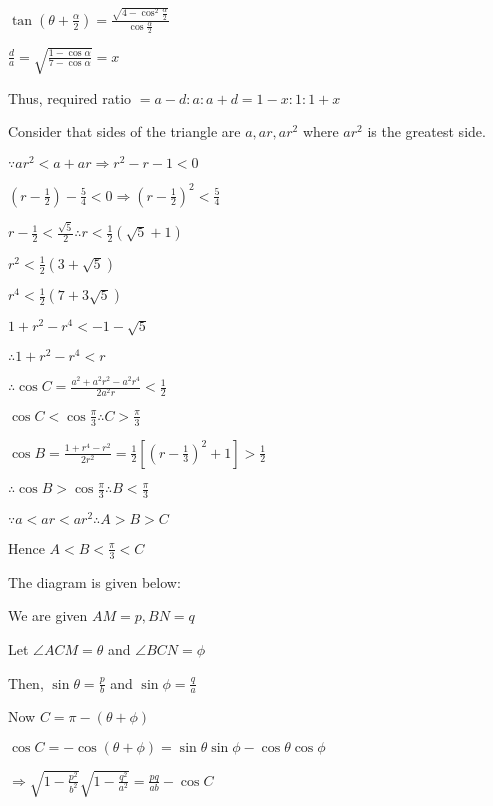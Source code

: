   $\tan\left(\theta + \frac{\alpha}{2}\right) = \frac{\sqrt{4 - \cos^2\frac{\alpha}{2}}}{\cos\frac{\alpha}{2}}$

  $\frac{d}{a} = \sqrt{\frac{1 - \cos\alpha}{7 - \cos\alpha}} = x$

  Thus, required ratio $= a - d:a:a + d = 1 - x: 1: 1 + x$

\item Consider that sides of the triangle are $a, ar, ar^2$ where $ar^2$ is the greatest side.

  $\because ar^2 < a + ar \Rightarrow r^2 -r - 1 < 0$

  $\left(r - \frac{1}{2}\right) - \frac{5}{4} < 0 \Rightarrow \left(r - \frac{1}{2}\right)^2 < \frac{5}{4}$

  $r - \frac{1}{2} < \frac{\sqrt{5}}{2} \therefore r < \frac{1}{2}(\sqrt{5} + 1)$

  $r^2 < \frac{1}{2}(3 + \sqrt{5})$

  $r^4 < \frac{1}{2}(7 + 3\sqrt{5})$

  $1 + r^2 - r^4 < - 1 - \sqrt{5}$

  $\therefore 1 + r^2 - r^4 < r$

  $\therefore \cos C = \frac{a^2 + a^2r^2 - a^2r^4}{2a^2r} < \frac{1}{2}$

  $\cos C < \cos \frac{\pi}{3} \therefore C > \frac{\pi}{3}$

  $\cos B = \frac{1 + r^4 - r^2}{2r^2} = \frac{1}{2}\left[\left(r - \frac{1}{3}\right)^2 + 1\right] > \frac{1}{2}$

  $\therefore \cos B > \cos\frac{\pi}{3} \therefore B < \frac{\pi}{3}$

  $\because a < ar <ar^2 \therefore A > B > C$

  Hence $A < B < \frac{\pi}{3} < C$

\item  The diagram is given below:

  \startplacefigure
    \externalfigure[20_5.pdf]
  \stopplacefigure

  We are given $AM = p, BN = q$

  Let $\angle ACM = \theta$ and $\angle BCN = \phi$

  Then, $\sin\theta = \frac{p}{b}$ and $\sin\phi = \frac{q}{a}$

  Now $C = \pi - (\theta + \phi)$

  $\cos C = -\cos(\theta + \phi) = \sin\theta\sin\phi -\cos\theta\cos\phi$

  $\Rightarrow \sqrt{1 - \frac{p^2}{b^2}}\sqrt{1 - \frac{q^2}{a^2}} = \frac{pq}{ab} - \cos C$

